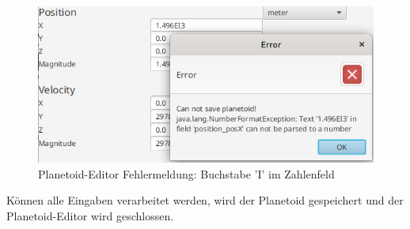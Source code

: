 \begin{figure}[H]
	\centering
	\includegraphics[width=12cm]{res/planetoidsaveerror.png}
	\caption[Planetoid-Editor Fehlermeldungsbeispiel]{Planetoid-Editor Fehlermeldung: Buchstabe 'I' im Zahlenfeld}
\end{figure}

Können alle Eingaben verarbeitet werden, wird der Planetoid gespeichert und der Planetoid-Editor wird geschlossen.
